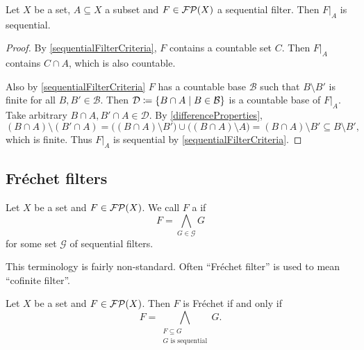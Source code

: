 \begin{proposition} \label{traceOfSequentialFilterSequential}
Let $X$ be a set, $A\subseteq X$ a subset and $F\in\operatorname{\mathcal{FP}}(X)$ a sequential filter. Then $F|_A$ is sequential.
\end{proposition}
\begin{proof}
By \ref{sequentialFilterCriteria}, $F$ contains a countable set $C$. Then $F|_A$ contains $C\cap A$, which is also countable.

Also by \ref{sequentialFilterCriteria} $F$ has a countable base $\mathcal{B}$ such that $B\setminus B'$ is finite for all $B,B'\in \mathcal{B}$. Then $\mathcal{D} \defeq \setbuilder{B\cap A}{B\in\mathcal{B}}$ is a countable base of $F|_A$. Take arbitrary $B\cap A, B'\cap A\in \mathcal{D}$. By \ref{differenceProperties},
\[ (B\cap A)\setminus(B'\cap A) = \big((B\cap A)\setminus B'\big) \cup \big((B\cap A)\setminus A\big) = (B\cap A)\setminus B' \subseteq B\setminus B', \]
which is finite. Thus $F|_A$ is sequential by \ref{sequentialFilterCriteria}.
\end{proof}

\subsection{Fréchet filters}
\begin{definition}
Let $X$ be a set and $F\in\operatorname{\mathcal{FP}}(X)$. We call $F$ a  if
\[ F = \bigwedge_{G\in \mathcal{G}}G \]
for some set $\mathcal{G}$ of sequential filters.
\end{definition}
This terminology is fairly non-standard. Often ``Fréchet filter'' is used to mean ``cofinite filter''.

\begin{lemma}
Let $X$ be a set and $F\in\operatorname{\mathcal{FP}}(X)$. Then $F$ is Fréchet \textup{if and only if}
\[ F = \bigwedge_{\substack{F\subseteq G \\ \text{$G$ is sequential}}} G. \]
\end{lemma}

